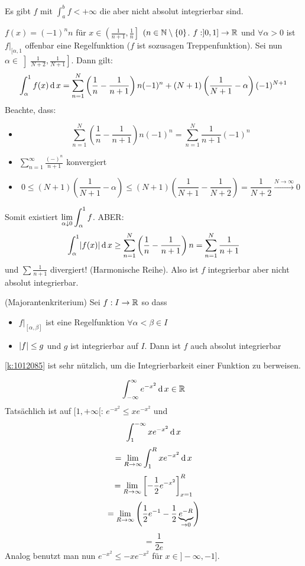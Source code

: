 \begin{Bem}
  Es gibt $f$ mit $\int_a^bf < +\infty$ die aber nicht absolut integrierbar sind.
\end{Bem}
\begin{Bsp}
  $f(x)=(-1)^nn$ für $x\in\left( \frac{1}{n+1},\frac{1}{n} \right]$ $(n\in\mathbb{N}\setminus\left\{ 0 \right\}$. $f:]0,1]\to\mathbb{R}$ und $\forall \alpha>0$ ist $f|_{[\alpha,1}$ offenbar eine Regelfunktion ($f$ ist sozusagen Treppenfunktion). Sei nun $\alpha\in\left] \frac{1}{N+2},\frac{1}{N+1} \right]$. Dann gilt:
  \[\int_\alpha^1f(x)\operatorname{d} x=\sum^N_{n=1}\left( \frac{1}{n}-\frac{1}{n+1} \right)n(-1)^n+(N+1)\left( \frac{1}{N+1}-\alpha \right)(-1)^{N+1}\]
  Beachte, dass:
  \begin{itemize}
    \item 
      \[\sum^N_{n=1}\left( \frac{1}{n}-\frac{1}{n+1} \right)n(-1)^n=\sum^N_{n=1}\frac{1}{n+1}(-1)^n\]
    \item $\sum^\infty_{n=1}\frac{(-)^n}{n+1}$ konvergiert
    \item 
      \[0\leq (N+1)\left( \frac{1}{N+1}-\alpha \right)\leq(N+1)\left( \frac{1}{N+1}-\frac{1}{N+2} \right)=\frac{1}{N+2}\stackrel{N\to\infty}{\rightarrow}0\]
  \end{itemize}
  Somit existiert $\displaystyle\lim_{\alpha\downarrow 0}\int_\alpha^1f$. ABER:
  \[\int_\alpha^1\mathopen| f(x) \mathclose|\operatorname{d} x\geq \sum^N_{n=1}\left( \frac{1}{n}-\frac{1}{n+1} \right)n=\sum_{n=1}^N\frac{1}{n+1}\]
  und $\sum\frac{1}{n+1}$ divergiert! (Harmonische Reihe). Also ist $f$ integrierbar aber nicht absolut integrierbar.
\end{Bsp}
\begin{Kor}{(Majorantenkriterium)}\label{k:1012085}
  Sei $f:I\to\mathbb{R}$ so dass
  \begin{itemize}
    \item $f|_{[\alpha,\beta]}$ ist eine Regelfunktion $\forall \alpha<\beta\in I$
    \item $\mathopen| f \mathclose|\leq g$ und $g$ ist integrierbar auf $I$. Dann ist $f$ auch absolut integrierbar
  \end{itemize}
\end{Kor}
\begin{Bem}\ref{k:1012085} ist sehr nützlich, um die Integrierbarkeit einer Funktion zu berweisen.
\end{Bem}
\begin{Bsp}
  \[\int_{-\infty}^\infty e^{-x^2}\operatorname{d} x\in\mathbb{R}\]
  Tatsächlich ist auf $[1,+\infty[$: $e^{-x^2}\leq xe^{-x^2}$ und
  \[\int_1^{-\infty}xe^{-x^2}\operatorname{d} x\]
  \[=\displaystyle\lim_{R\rightarrow\infty}\int_1^Rxe^{-x^2}\operatorname{d} x\]
  \[=\displaystyle\lim_{R\rightarrow\infty}\left[ -\frac{1}{2}e^{-x^2} \right]_{x=1}^R\]
  \[=\displaystyle\lim_{R\rightarrow\infty}\left( \frac{1}{2}e^{-1}-\frac{1}{2}\underbrace{e^{-R}}_{\to 0} \right)\]
  \[=\frac{1}{2e}\]
  Analog benutzt man nun $e^{-x^2}\leq -xe^{-x^2}$ für $x\in]-\infty,-1]$.
\end{Bsp}
